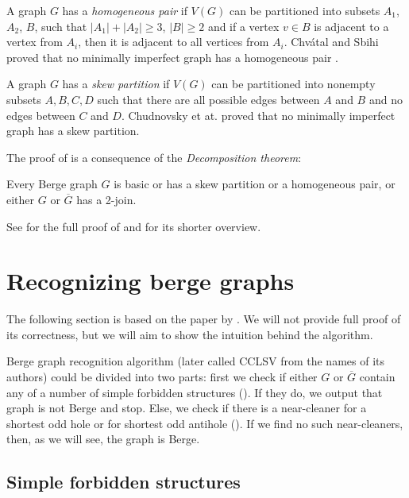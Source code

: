 A graph $G$ has a \emph{homogeneous pair} if $V(G)$ can be partitioned into subsets $A_1$, $A_2$, $B$, such that $|A_1|+|A_2| \geq 3$, $|B| \geq 2$ and if a vertex $v \in B$ is adjacent to a vertex from $A_i$, then it is adjacent to all vertices from $A_i$. Chvátal and Sbihi proved that no minimally imperfect graph has a homogeneous pair \cite{Chvtal1987}.

A graph $G$ has a \emph{skew partition} if $V(G)$ can be partitioned into nonempty subsets $A, B, C, D$ such that there are all possible edges between $A$ and $B$ and no edges between $C$ and $D$. Chudnovsky et at. proved that no minimally imperfect graph has a skew partition.

The proof of  is a consequence of the \emph{Decomposition theorem}:

\begin{theorem}
	\label{thm:decomposition}
	Every Berge graph $G$ is basic or has a skew partition or a homogeneous pair, or either $G$ or $\overline{G}$ has a 2-join.
\end{theorem}

See \cite{MC06} for the full proof of  and \cite{GC03} for its shorter overview.

\section{Recognizing berge graphs}
\label{sec:recognizingBerge}

The following section is based on the paper by \citeauthor{MC05}  \cite{MC05}. We will not provide full proof of its correctness, but we will aim to show the intuition behind the algorithm.

Berge graph recognition algorithm (later called CCLSV from the names of its authors) could be divided into two parts: first we check if either $G$ or $\overline{G}$ contain any of a number of simple forbidden structures (). If they do, we output that graph is not Berge and stop. Else, we check if there is a near-cleaner for a shortest odd hole or for shortest odd antihole (). If we find no such near-cleaners, then, as we will see, the graph is Berge.

\subsection{Simple forbidden structures}
\label{SimpleStructures}

